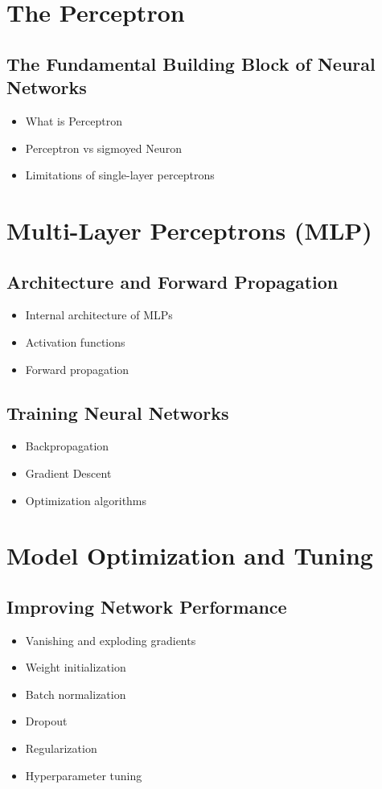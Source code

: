 \documentclass[12pt,openany]{book}
\begin{document}
\section{The Perceptron}

\subsection{The Fundamental Building Block of Neural Networks}
\begin{itemize}
    \item What is Perceptron
    \item Perceptron vs sigmoyed Neuron
    \item Limitations of single-layer perceptrons
\end{itemize}

\section{Multi-Layer Perceptrons (MLP)}

\subsection{Architecture and Forward Propagation}
\begin{itemize}
    \item Internal architecture of MLPs
    \item Activation functions
    \item Forward propagation
\end{itemize}

\subsection{Training Neural Networks}
\begin{itemize}
    \item Backpropagation
    \item Gradient Descent
    \item Optimization algorithms
\end{itemize}

\section{Model Optimization and Tuning}

\subsection{Improving Network Performance}
\begin{itemize}
    \item Vanishing and exploding gradients
    \item Weight initialization
    \item Batch normalization
    \item Dropout
    \item Regularization
    \item Hyperparameter tuning
\end{itemize}
\end{document}

